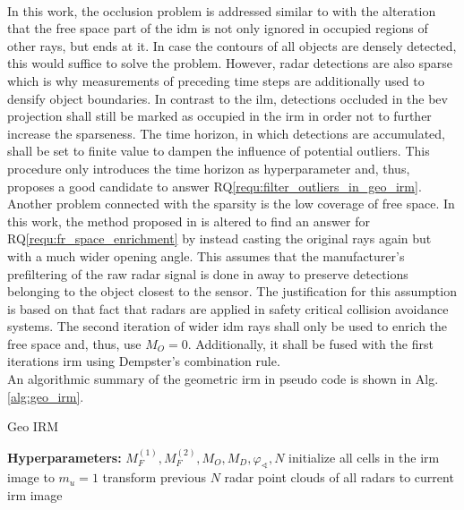 \\
In this work, the occlusion problem is addressed similar to \cite{werber2015automotive} with the alteration that the free space part of the \gls{idm} is not only ignored in occupied regions of other rays, but ends at it. In case the contours of all objects are densely detected, this would suffice to solve the problem. However, radar detections are also sparse which is why measurements of preceding time steps are additionally used to densify object boundaries. In contrast to the \gls{ilm}, detections occluded in the \gls{bev} projection shall still be marked as occupied in the \gls{irm} in order not to further increase the sparseness. The time horizon, in which detections are accumulated, shall be set to finite value to dampen the influence of potential outliers. This procedure only introduces the time horizon as hyperparameter and, thus, proposes a good candidate to answer RQ\ref{requ:filter_outliers_in_geo_irm}.
\\
Another problem connected with the sparsity is the low coverage of free space. In this work, the method proposed in \cite{prophet2018adaptions} is altered to find an answer for RQ\ref{requ:fr_space_enrichment} by instead casting the original rays again but with a much wider opening angle. This assumes that the manufacturer's prefiltering of the raw radar signal is done in away to preserve detections belonging to the object closest to the sensor. The justification for this assumption is based on that fact that radars are applied in safety critical collision avoidance systems. The second iteration of wider \gls{idm} rays shall only be used to enrich the free space and, thus, use $M_O = 0$. Additionally, it shall be fused with the first iterations \gls{irm} using Dempster's combination rule.
\\
An algorithmic summary of the geometric \gls{irm} in pseudo code is shown in Alg. \ref{alg:geo_irm}.\\
\begin{algorithm}[H]
	\caption{\label{alg:geo_irm}Geo IRM}
	\textbf{Hyperparameters:} $M_F^{(1)}, M_F^{(2)}, M_O, M_D, \varphi_\sphericalangle, N$\;	
	initialize all cells in the \gls{irm} image to $m_u=1$\;
	transform previous $N$ radar point clouds of all radars to current \gls{irm} image\;
\end{algorithm}
%
